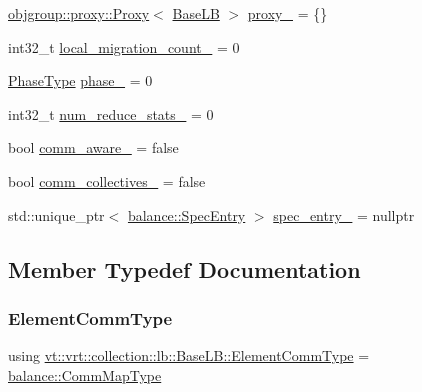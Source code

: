 \begin{DoxyCompactItemize}
\item 
\hyperlink{structvt_1_1objgroup_1_1proxy_1_1_proxy}{objgroup\+::proxy\+::\+Proxy}$<$ \hyperlink{structvt_1_1vrt_1_1collection_1_1lb_1_1_base_l_b}{Base\+LB} $>$ \hyperlink{structvt_1_1vrt_1_1collection_1_1lb_1_1_base_l_b_ab5cfe4d0cb73397c5ffe937f119bc71a}{proxy\+\_\+} = \{\}
\item 
int32\+\_\+t \hyperlink{structvt_1_1vrt_1_1collection_1_1lb_1_1_base_l_b_ae2beaf58c52b6ac2ccca8ab0c266f203}{local\+\_\+migration\+\_\+count\+\_\+} = 0
\item 
\hyperlink{namespacevt_a46ce6733d5cdbd735d561b7b4029f6d7}{Phase\+Type} \hyperlink{structvt_1_1vrt_1_1collection_1_1lb_1_1_base_l_b_a9bb7a04d3ef1012c95322d8375593498}{phase\+\_\+} = 0
\item 
int32\+\_\+t \hyperlink{structvt_1_1vrt_1_1collection_1_1lb_1_1_base_l_b_a15441a3f924a5dd38fb315d84aa6a7c8}{num\+\_\+reduce\+\_\+stats\+\_\+} = 0
\item 
bool \hyperlink{structvt_1_1vrt_1_1collection_1_1lb_1_1_base_l_b_a0b7eb81cc499a7cd7c1a6fd1f6a3c8fe}{comm\+\_\+aware\+\_\+} = false
\item 
bool \hyperlink{structvt_1_1vrt_1_1collection_1_1lb_1_1_base_l_b_a1db6d0f8b8f62be357c7913930556d44}{comm\+\_\+collectives\+\_\+} = false
\item 
std\+::unique\+\_\+ptr$<$ \hyperlink{structvt_1_1vrt_1_1collection_1_1balance_1_1_spec_entry}{balance\+::\+Spec\+Entry} $>$ \hyperlink{structvt_1_1vrt_1_1collection_1_1lb_1_1_base_l_b_a20ee2c313345b2fe60de1141f69774bd}{spec\+\_\+entry\+\_\+} = nullptr
\end{DoxyCompactItemize}


\subsection{Member Typedef Documentation}
\mbox{\label{structvt_1_1vrt_1_1collection_1_1lb_1_1_base_l_b_ac3f8560bfe41aa593eb7d5bd1241cc4c}} 
\subsubsection{\texorpdfstring{Element\+Comm\+Type}{ElementCommType}}
{\footnotesize\ttfamily using \hyperlink{structvt_1_1vrt_1_1collection_1_1lb_1_1_base_l_b_ac3f8560bfe41aa593eb7d5bd1241cc4c}{vt\+::vrt\+::collection\+::lb\+::\+Base\+L\+B\+::\+Element\+Comm\+Type} =  \hyperlink{namespacevt_1_1vrt_1_1collection_1_1balance_aa50d4cbbfa3c643e7303fc6e08f411fb}{balance\+::\+Comm\+Map\+Type}}

